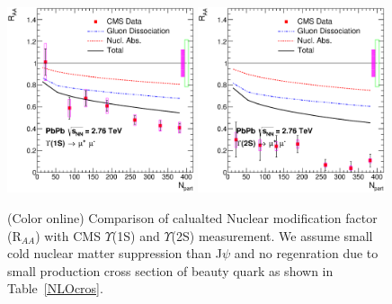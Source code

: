 \documentclass[aps,prc,preprint,superscriptaddress,showpacs,showkeys]{revtex4-1}
\begin{document}
\begin{figure}
\includegraphics[width=0.49\textwidth]{Fig6a_CMS_RAA_Upsilon1S.eps}
\includegraphics[width=0.49\textwidth]{Fig6b_CMS_RAA_Upsilon2S.eps}
\caption{(Color online) Comparison of calualted Nuclear modification factor (R$_{AA}$) with CMS $\Upsilon$(1S) and $\Upsilon$(2S) measurement.
We assume small cold nuclear matter suppression than J$\psi$ and no regenration due to small production cross section of beauty quark as shown in Table~\ref{NLOcros}.}
\label{fig:UpsilonRaa}
\end{figure}

 
\end{document}
